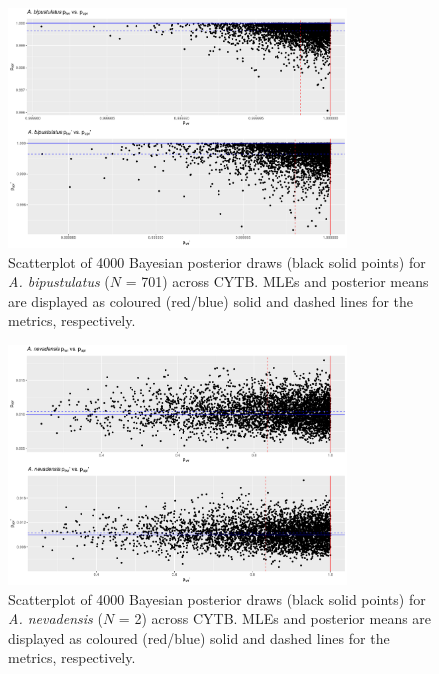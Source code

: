 \documentclass[12pt]{article}
\begin{document}
\begin{figure}[H]

\centering

\includegraphics[width=0.80\textwidth]{Figure 3}

\caption{Scatterplot of 4000 Bayesian posterior draws (black solid points) for \textit{A. bipustulatus} ($N$ = 701) across CYTB. MLEs and posterior means are displayed as coloured (red/blue) solid and dashed lines for the metrics, respectively.}

\end{figure}

\newpage


\begin{figure}[H]

\centering

\includegraphics[width=0.80\textwidth]{Figure 4}

\caption{Scatterplot of 4000 Bayesian posterior draws (black solid points) for \textit{A. nevadensis} ($N$ = 2) across CYTB. MLEs and posterior means are displayed as coloured (red/blue) solid and dashed lines for the metrics, respectively.}

\end{figure}
\end{document}
